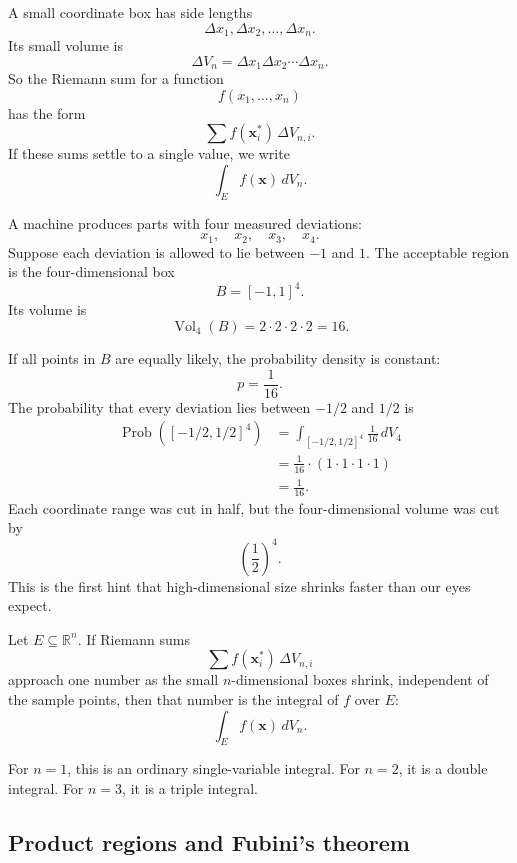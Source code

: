 A small coordinate box has side lengths
\[
    \Delta x_1,\Delta x_2,\ldots,\Delta x_n.
\]
Its small volume is
\[
    \Delta V_n
    =
    \Delta x_1\Delta x_2\cdots\Delta x_n.
\]
So the Riemann sum for a function
\[
    f(x_1,\ldots,x_n)
\]
has the form
\[
    \sum f(\mathbf x_i^*)\,\Delta V_{n,i}.
\]
If these sums settle to a single value, we write
\[
\boxed{
    \int_E f(\mathbf x)\,dV_n.
}
\]

\begin{example}
A machine produces parts with four measured deviations:
\[
    x_1,\quad x_2,\quad x_3,\quad x_4.
\]
Suppose each deviation is allowed to lie between \(-1\) and \(1\).  The acceptable
region is the four-dimensional box
\[
    B=[-1,1]^4.
\]
Its volume is
\[
    \operatorname{Vol}_4(B)=2\cdot2\cdot2\cdot2=16.
\]

If all points in \(B\) are equally likely, the probability density is constant:
\[
    p=\frac1{16}.
\]
The probability that every deviation lies between \(-1/2\) and \(1/2\) is
\[
\begin{aligned}
\operatorname{Prob}\left([-1/2,1/2]^4\right)
&=
\int_{[-1/2,1/2]^4}\frac1{16}\,dV_4\\
&=
\frac1{16}\cdot
(1\cdot1\cdot1\cdot1)\\
&=
\frac1{16}.
\end{aligned}
\]
Each coordinate range was cut in half, but the four-dimensional volume was cut by
\[
    \left(\frac12\right)^4.
\]
This is the first hint that high-dimensional size shrinks faster than our eyes expect.
\end{example}

\begin{definition}
Let \(E\subseteq\mathbb R^n\).  If Riemann sums
\[
    \sum f(\mathbf x_i^*)\,\Delta V_{n,i}
\]
approach one number as the small \(n\)-dimensional boxes shrink, independent of the
sample points, then that number is the integral of \(f\) over \(E\):
\[
\boxed{
    \int_E f(\mathbf x)\,dV_n.
}
\]
\end{definition}

For \(n=1\), this is an ordinary single-variable integral.  For \(n=2\), it is a double
integral.  For \(n=3\), it is a triple integral.

\subsection{Product regions and Fubini's theorem}

